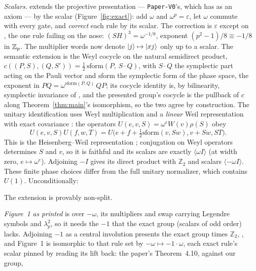 \emph{Scalars.}   extends the projective
presentation --- \texttt{Paper-V0}'s, which has  as an
axiom --- by the scalar (Figure~\ref{fig:exact}): add $\omega$ and $\omega^{p} = \varepsilon$,
let $\omega$ commute with every gate, and \emph{correct} each rule by
its scalar.  The correction is $\varepsilon$ except on
, the one rule failing on the nose: $(SH)^3 =
\omega^{-1/8}$, exponent $(p^2{-}1)/8 \equiv -1/8$ in $\mathbb{Z}_p$.
The multiplier words now denote $|j\rangle \mapsto |xj\rangle$
only up to a scalar.  The semantic extension is
the Weyl cocycle on the natural semidirect product, $c((P,S),(Q,S'))
= \tfrac12\,\mathrm{sform}(P,\ S \cdot Q)$, with $S \cdot Q$ the
symplectic part acting on the Pauli vector and $\mathrm{sform}$ the
symplectic form of the phase space, the exponent in $PQ =
\omega^{\mathrm{sform}(P,Q)}\,QP$; its cocycle identity is, by
bilinearity, symplectic invariance of , and the
presented group's cocycle is the pullback of $c$ along
Theorem~\ref{thm:main}'s isomorphism, so the two agree by
construction.  The unitary identification uses Weyl multiplication
\cite[Eq.~(4), Theorem~3]{gross2006hudson} and a \emph{linear} Weil
representation with exact covariance
\cite[Theorem~1.3.2]{gurevich2007geometric}: the operators
$U(e,v,S)=\omega^e W(v)\rho(S)$ obey
\[
 U(e,v,S)U(f,w,T)
 =U\bigl(e+f+\tfrac12\mathrm{sform}(v,Sw),v+Sw,ST\bigr).
\]
This is the Heisenberg--Weil representation
\cite[\S 1.3]{gurevich2010bounds}; conjugation on Weyl operators
determines $S$ and $v$, so it is faithful and its scalars are exactly
$\langle\omega I\rangle$ (at width zero, $e\mapsto\omega^e$).
Adjoining $-I$ gives its direct product with $\mathbb Z_2$ and scalars
$\langle-\omega I\rangle$.  These finite phase choices differ from
the full unitary normalizer, which contains $U(1)$.
Unconditionally:



\noindent The extension is provably non-split.

\emph{Figure~1 as printed} is over $-\omega$, its multipliers and swap
carrying Legendre symbols and $\lambda_p^2$, so it needs the $-1$ that
the exact group (scalars of odd order) lacks.  Adjoining $-1$ as a
central involution presents the exact group times $\mathbb Z_2$,
, and Figure~1 is isomorphic to that rule set by
$-\omega \mapsto -1\cdot\omega$, each exact rule's scalar pinned by
reading its lift back: the paper's Theorem~4.10, against our group,

